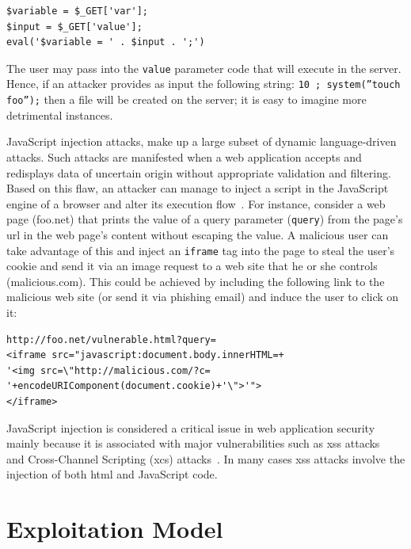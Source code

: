 \documentclass[conference]{IEEEtran}
\begin{document}
\bgroup \lstset{language=PHP}
\begin{small}
\begin{lstlisting}
$variable = $_GET['var']; 
$input = $_GET['value'];
eval('$variable = ' . $input . ';')
\end{lstlisting}
\end{small}
\egroup

\noindent
The user may pass into the {\tt value} parameter code that will
execute in the server. Hence, if an attacker provides as
input the following string: {\tt 10 ; system(''touch foo'');}
then a file will be created on the server; it is easy
to imagine more detrimental instances.

JavaScript injection attacks, make up a large subset of dynamic
language-driven attacks. Such attacks are manifested when a web
application accepts and redisplays data of uncertain origin without
appropriate validation and filtering. Based on this flaw, an attacker
can manage to inject a script in the JavaScript engine of a browser
and alter its execution flow~\cite{ELX07}. For instance,
consider a web page (foo.net) that prints the value
of a query parameter ({\tt query}) from the
page's {\sc url} in the web page's content
without escaping the value. A malicious user
can take advantage of this and inject an {\tt iframe} tag
into the page to steal the user's cookie and
send it via an image request to a web site
that he or she controls (malicious.com).
This could be achieved by including the following
link to the malicious web site (or send it via phishing
email) and induce the user to click on it:

\lstset{language=VBScript, basicstyle=\footnotesize\ttfamily,}
\begin{lstlisting}
http://foo.net/vulnerable.html?query=
<iframe src="javascript:document.body.innerHTML=+
'<img src=\"http://malicious.com/?c=
'+encodeURIComponent(document.cookie)+'\">'">
</iframe>
\end{lstlisting}

\noindent
JavaScript injection is considered a critical issue in web application security
mainly because it is associated with major vulnerabilities such as
{\sc xss} attacks~\cite{SG07} and Cross-Channel Scripting
({\sc xcs}) attacks~\cite{W10,BBB09}. In many cases {\sc xss} attacks
involve the injection of both {\sc html} and JavaScript code.

\section{Exploitation Model}
\label{sec:model}
\end{document}
